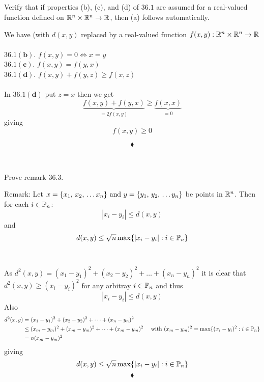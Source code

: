 \subsection{}
\begin{tcolorbox}
Verify that if properties (b), (c), and (d) of $\mathbf{36.1}$ are assumed for a real-valued function defined on $\mathbb{R}^n\times \mathbb{R}^n\rightarrow \mathbb{R}$, then (a) follows automatically.
\end{tcolorbox}
We have (with $d(x,y)$ replaced by a real-valued function $f(x,y): \mathbb{R}^n\times \mathbb{R}^n\rightarrow \mathbb{R}$\\\\
$\mathbf{36.1( b)}$. $f(x,y)=0 \Leftrightarrow x=y$\\
$\mathbf{36.1( c)}$. $f(x,y)=f(y,x)$\\
$\mathbf{36.1( d)}$. $f(x,y)+ f(y,z)\geq f(x,z)$\\\\
In $\mathbf{36.1( d)}$ put $z=x$ then we get 
$$\underbrace{f(x,y)+ f(y,x)}_{=2f(x,y)}\geq \underbrace{f(x,x)}_{=0}$$
giving 
$$f(x,y)\geq 0$$

$$\blacklozenge$$\\


\subsection{}
\begin{tcolorbox}
Prove remark $\mathbf{36.3}$.
\end{tcolorbox}
Remark: Let $x=\{x_1,\, x_2,\, \dots x_n\} \text{ and } y=\{y_1,\, y_2,\, \dots y_n\} $ be points in $\mathbb{R}^n$. Then for each $i\in \mathbb{P}_n$:
$$|x_i-y_i| \leq d(x,y)$$
and 
$$d(x,y)\leq \sqrt{n}\max\{|x_i-y_i|: i\in \mathbb{P}_n\}$$\\\\
As $d^2(x,y)=  (x_1-y_1)^2+(x_2-y_2)^2+\dots +(x_n-y_n)^2 $ it is clear that $d^2(x,y)\geq  (x_i-y_i)^2$ for any arbitray $i\in \mathbb{P}_n$ and thus 
$$|x_i-y_i| \leq d(x,y)$$
Also 
\begin{align*}
d^2(x,y)&=  (x_1-y_1)^2+(x_2-y_2)^2+\dots +(x_n-y_n)^2 \\
&\leq (x_m-y_m)^2+(x_m-y_m)^2+\dots +(x_m-y_m)^2\quad \text{ with } (x_m-y_m)^2=  \max\{(x_i-y_i)^2: i\in \mathbb{P}_n\}\\
&=n (x_m-y_m)^2
\end{align*}
giving 
$$d(x,y)\leq \sqrt{n}\max\{|x_i-y_i|: i\in \mathbb{P}_n\}$$
$$\blacklozenge$$\\



